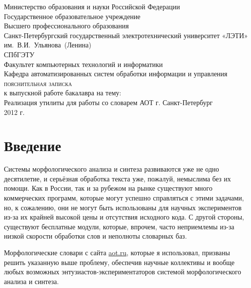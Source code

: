 \documentclass[12pt,a4paper,onecolumn]{report}
\begin{document}
\begin{titlepage}
\begin{center}
Министерство образования и науки Российской Федерации\\
Государственное образовательное учреждение\\
Высшего профессионального образования\\
Санкт-Петербургский государственный электротехнический университет «ЛЭТИ» им.~В.И.~Ульянова~(Ленина)\\СПбГЭТУ\\[1cm]

Факультет компьютерных технологий и информатики\\
Кафедра автоматизированных систем обработки информации и управления\\[5cm]
{\large
\textsc{пояснительная записка}\\
к выпускной работе бакалавра на тему:\\
Реализация утилиты для работы со словарем АОТ}
\vfill
г. Санкт-Петербург\\
2012 г.
\end{center}
\end{titlepage}
\tableofcontents
\chapter*{Введение}
Системы морфологического анализа и синтеза развиваются уже не одно десятилетие, и серьёзная обработка текста уже, пожалуй, немыслима без их помощи. Как в России, так и за рубежом на рынке существуют много коммерческих программ, которые могут успешно справляться с этими задачами, но, к сожалению, они не могут быть использованы для научных экспериментов из-за их крайней высокой цены и отсутствия  исходного кода. С другой стороны, существуют бесплатные модули, которые, впрочем, часто неприемлемы из-за низкой скорости обработки слов и неполноты словарных баз.

Морфологические словари с сайта \href{http://www.aot.ru/}{aot.ru}, которые я использовал, призваны решить указанную выше проблему, обеспечив научные коллективы и вообще любых возможных энтузиастов-экспериментаторов системой морфологического анализа и синтеза.
\end{document}
